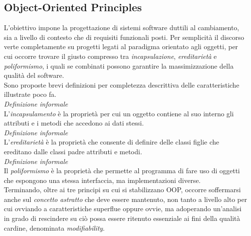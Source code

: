\documentclass{article}
\begin{document}
\subsection*{Object-Oriented Principles}
\large
L'obiettivo impone la progettazione di sistemi software duttili al cambiamento, sia a livello di contesto che di requisiti funzionali posti. Per semplicità il discorso verte completamente su progetti legati al paradigma orientato agli oggetti, per cui occorre trovare il giusto compresso tra \textit{incapsulazione}, \textit{ereditarietà} e \textit{poliformismo}, i quali se combinati possono garantire la massimizzazione della qualità del software.\vspace*{14pt}\\
Sono proposte brevi definizioni per completezza descrittiva delle caratteristiche illustrate poco fa.\vspace*{14pt}\\
\textit{Definizione informale}\\
L'\textit{incapsulamento} è la proprietà per cui un oggetto contiene al suo interno gli attributi e i metodi che accedono ai dati stessi.\vspace*{14pt}\\
\textit{Definizione informale}\\
L'\textit{ereditarietà} è la proprietà che consente di definire delle classi figlie che ereditano dalle classi padre attributi e metodi.\vspace*{14pt}\\
\textit{Definizione informale}\\
Il \textit{poliformismo} è la proprietà che permette al programma di fare uso di oggetti che espongono una stessa interfaccia, ma implementazioni diverse.\vspace*{14pt}\\
Terminando, oltre ai tre principi su cui si stabilizzano OOP, occorre soffermarsi anche sul \textit{concetto astratto} che deve essere mantenuto, non tanto a livello alto per cui ovviando a caratteristiche superflue oppure ovvie, ma adoperando un'analisi in grado di rescindere su ciò possa essere ritenuto essenziale ai fini della qualità cardine, denominata \textit{modifiability}.
\end{document}
